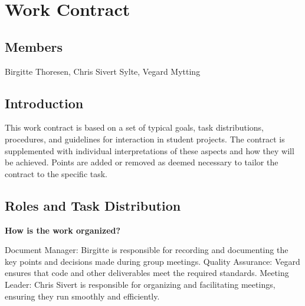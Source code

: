 \chapter{Work Contract}
\section*{Members}
Birgitte Thoresen, Chris Sivert Sylte, Vegard Mytting

\section*{Introduction}
This work contract is based on a set of typical goals, task distributions, procedures, and guidelines for interaction in student projects. The contract is supplemented with individual interpretations of these aspects and how they will be achieved.  
Points are added or removed as deemed necessary to tailor the contract to the specific task.  

\section*{Roles and Task Distribution}
\textbf{How is the work organized?}  

Document Manager: Birgitte is responsible for recording and documenting the key points and decisions made during group meetings.
Quality Assurance: Vegard ensures that code and other deliverables meet the required standards.
Meeting Leader: Chris Sivert is responsible for organizing and facilitating meetings, ensuring they run smoothly and efficiently.

